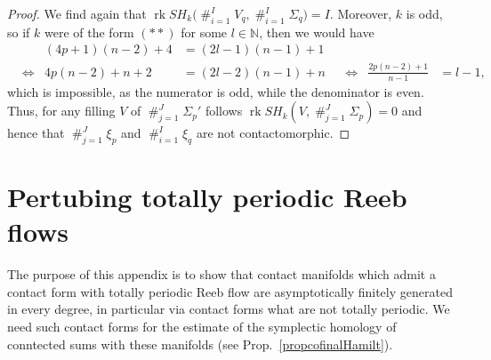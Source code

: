 \documentclass[a4paper,12pt,bibliography=totocnumbered,titlepage=false,abstracton,bookmarksnumbered=true]{scrartcl}
\DeclareMathOperator*{\consumt}{\#}
\DeclareMathOperator{\rk}{rk}
\theoremstyle{definition}
\begin{document}
\begin{proof}
 We find again that $\rk SH_k\Big(\consumt_{i=1}^I V_q, \consumt_{i=1}^I \Sigma_q\Big) = I.$ Moreover, $k$ is odd, so if $k$ were of the form $(\ast\ast)$ for some $l\in\mathbb{N}$, then we would have
 \begin{align*}
  && (4p{+}1)(n{-}2)+4 &= (2l{-}1)(n{-}1)+1 \\
  &\Leftrightarrow& 4p(n{-}2)+n+2 &=(2l{-}2)(n{-}1)+n &&\Leftrightarrow& \frac{2p(n{-}2)+1}{n{-}1} &= l{-}1,
 \end{align*}
 which is impossible, as the numerator is odd, while the denominator is even. Thus, for any filling $V$ of $\consumt_{j=1}^J \Sigma_p'$ follows $\rk SH_k\left(V,\consumt_{j=1}^J\Sigma_p\right)=0$ 
 and hence that $\consumt_{j=1}^J \xi_p$ and $\consumt_{i=1}^I \xi_q$ are not contactomorphic.
\end{proof}

\appendix
\section{Pertubing totally periodic Reeb flows}\label{appendixA}
The purpose of this appendix is to show that contact manifolds which admit a contact form with totally periodic Reeb flow are asymptotically finitely generated in every degree, in particular via contact forms what are not totally periodic. We need such contact forms for the estimate of the symplectic homology of conntected sums with these manifolds (see Prop.\ \ref{propcofinalHamilt}).
\end{document}

